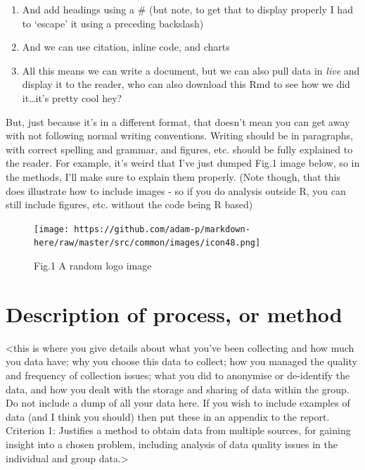 \documentclass[]{article}
\providecommand{\tightlist}{%
  \setlength{\itemsep}{0pt}\setlength{\parskip}{0pt}}
\begin{document}
\begin{enumerate}
\def\labelenumi{\arabic{enumi}.}
\setcounter{enumi}{1}
\tightlist
\item
  And add headings using a \# (but note, to get that to display properly
  I had to `escape' it using a preceding backslash)
\item
  And we can use citation, inline code, and charts
\item
  All this means we can write a document, but we can also pull data in
  \emph{live} and display it to the reader, who can also download this
  Rmd to see how we did it\ldots it's pretty cool hey?
\end{enumerate}

But, just because it's in a different format, that doesn't mean you can
get away with not following normal writing conventions. Writing should
be in paragraphs, with correct spelling and grammar, and figures, etc.
should be fully explained to the reader. For example, it's weird that
I've just dumped Fig.1 image below, so in the methods, I'll make sure to
explain them properly. (Note though, that this does illustrate how to
include images - so if you do analysis outside R, you can still include
figures, etc. without the code being R based)

\begin{figure}
\centering
\texttt{[image: https://github.com/adam-p/markdown-here/raw/master/src/common/images/icon48.png]}
\caption{Fig.1 A random logo image}
\end{figure}

\hypertarget{description-of-process-or-method}{%
\section{Description of process, or
method}\label{description-of-process-or-method}}

\textless this is where you give details about what you've been
collecting and how much you data have; why you choose this data to
collect; how you managed the quality and frequency of collection issues;
what you did to anonymise or de-identify the data, and how you dealt
with the storage and sharing of data within the group. Do not include a
dump of all your data here. If you wish to include examples of data (and
I think you should) then put these in an appendix to the report.\\
Criterion 1: Justifies a method to obtain data from multiple sources,
for gaining insight into a chosen problem, including analysis of data
quality issues in the individual and group data.\textgreater{}
\end{document}
